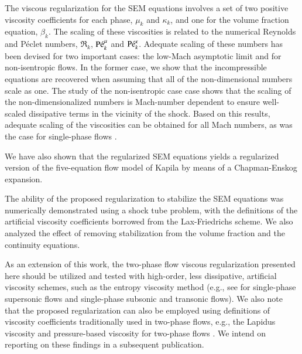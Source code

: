 \documentclass[preprint,10pt]{elsarticle}
\begin{document}
The viscous regularization for the SEM equations involves a set of two positive viscosity coefficients for each phase, $\mu_k$ and $\kappa_k$, and one for the volume fraction equation, $\beta_k$. 
The scaling of these viscosities is related to the numerical Reynolds and P\'eclet numbers, $\Re_k$, $\textrm{P\'e}_k^\mu$ and $\textrm{P\'e}_k^\kappa$. Adequate scaling of these numbers has been devised for two 
important cases: the low-Mach asymptotic limit and for non-isentropic flows. In the former case, we show that the incompressible equations are recovered when assuming that all of the non-dimensional 
numbers scale as one. The study of the non-isentropic case case shows that the scaling of the non-dimensionalized numbers is Mach-number dependent to ensure well-scaled dissipative terms in the vicinity of the shock.
Based on this results, adequate scaling of the viscosities can be obtained for all Mach numbers, as was the case for single-phase flows \cite{Marco_paper_low_mach}. 

We have also shown that the regularized SEM equations yields a regularized version of the five-equation flow model of Kapila by means of a Chapman-Enskog expansion.

The ability of the proposed regularization to stabilize the SEM equations was numerically demonstrated using a shock tube problem, with the definitions of the 
artificial viscosity coefficients borrowed from the Lax-Friedrichs scheme. We also analyzed the effect of removing stabilization from the volume fraction and the continuity equations.

As an extension of this work, the two-phase flow viscous regularization presented here should be utilized and tested with high-order, less dissipative, artificial viscosity schemes, 
such as the entropy viscosity method (e.g., see \cite{jlg1} for single-phase supersonic flows and \cite{Marco_paper_low_mach} single-phase subsonic and transonic flows). 
We also note that the proposed regularization can also be employed using definitions of viscosity coefficients traditionally used in two-phase flows, e.g., 
the Lapidus viscosity \cite{Lapidus_paper, Lapidus_book} and pressure-based viscosity for two-phase flows \cite{PBV_book}. We intend on reporting on these findings in a subsequent
publication. 

%

\clearpage

\end{document}
